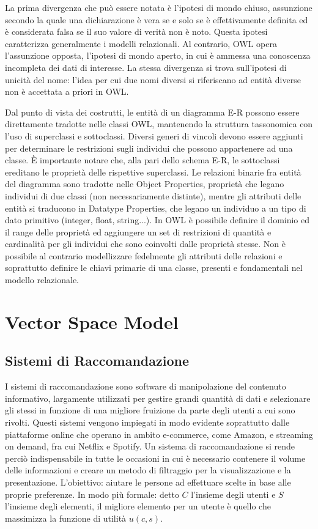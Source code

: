 \documentclass[Lau,binding=0.6cm,noexaminfo]{sapthesis}
\begin{document}
La prima divergenza che può essere notata è l'ipotesi di mondo chiuso, assunzione secondo la quale una dichiarazione è vera se e solo se è effettivamente definita ed è considerata falsa se il suo valore di verità non è noto. Questa ipotesi caratterizza generalmente i modelli relazionali. Al contrario, OWL opera l'assunzione opposta, l'ipotesi di mondo aperto, in cui è ammessa una conoscenza incompleta dei dati di interesse. La stessa divergenza si trova sull'ipotesi di unicità del nome: l'idea per cui due nomi diversi si riferiscano ad entità diverse non è accettata a priori in OWL.\medskip

Dal punto di vista dei costrutti, le entità di un diagramma E-R possono essere direttamente tradotte nelle classi OWL, mantenendo la struttura tassonomica con l'uso di superclassi e sottoclassi. Diversi generi di vincoli devono essere aggiunti per determinare le restrizioni sugli individui che possono appartenere ad una classe. \MakeUppercase{è} importante notare che, alla pari dello schema E-R, le sottoclassi ereditano le proprietà delle rispettive superclassi.
Le relazioni binarie fra entità del diagramma sono tradotte nelle Object Properties, proprietà che legano individui di due classi (non necessariamente distinte), mentre gli attributi delle entità si traducono in Datatype Properties, che legano un individuo a un tipo di dato primitivo (integer, float, string...). In OWL è possibile definire il dominio ed il range delle proprietà ed aggiungere un set di restrizioni di quantità e cardinalità per gli individui che sono coinvolti dalle proprietà stesse. Non è possibile al contrario modellizzare fedelmente gli attributi delle relazioni e soprattutto definire le chiavi primarie di una classe, presenti e fondamentali nel modello relazionale.\medskip

\chapter{Vector Space Model}
\section{Sistemi di Raccomandazione}

I sistemi di raccomandazione sono software di manipolazione del contenuto informativo, largamente utilizzati per gestire grandi quantità di dati e selezionare gli stessi in funzione di una migliore fruizione da parte degli utenti a cui sono rivolti. Questi sistemi vengono impiegati in modo evidente soprattutto dalle piattaforme online che operano in ambito e-commerce, come Amazon, e streaming on demand, fra cui Netflix e Spotify. Un sistema di raccomandazione si rende perciò indispensabile in tutte le occasioni in cui è necessario contenere il volume delle informazioni e creare un metodo di filtraggio per la visualizzazione e la presentazione. L'obiettivo: aiutare le persone ad effettuare scelte in base alle proprie preferenze. In modo più formale: detto $C$ l'insieme degli utenti e $S$ l'insieme degli elementi, il migliore elemento per un utente è quello che massimizza la funzione di utilità $u(c,s)$.
\end{document}
